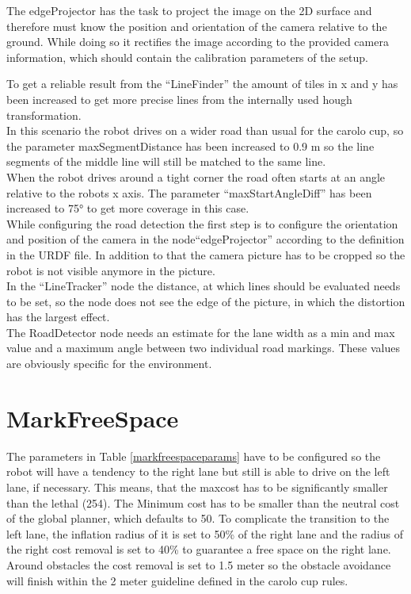 The edgeProjector has the task to project the image on the 2D surface and therefore must know the position and orientation of the camera relative to the ground. While doing so it rectifies the image according to the provided camera information, which should contain the calibration parameters of the setup.

To get a reliable result from the ``LineFinder'' the amount of tiles in x and y has been increased to get more precise lines from the internally used hough transformation.\\
In this scenario the robot drives on a wider road than usual for the carolo cup, so the parameter maxSegmentDistance has been increased to 0.9 m so the line segments of the middle line will still be matched to the same line.\\
When the robot drives around a tight corner the road often starts at an angle relative to the robots x axis. The parameter ``maxStartAngleDiff'' has been increased to 75° to get more coverage in this case.\\

While configuring the road detection the first step is to configure the orientation and position of the camera in the node``edgeProjector'' according to the definition in the URDF file. In addition to that the camera picture has to be cropped so the robot is not visible anymore in the picture.\\

In the ``LineTracker'' node the distance, at which lines should be evaluated needs to be set, so the node does not see the edge of the picture, in which the distortion has the largest effect.\\


The RoadDetector node needs an estimate for the lane width as a min and max value and a maximum angle between two individual road markings. These values are obviously specific for the environment.\\

\section{MarkFreeSpace}

The parameters in Table \ref{markfreespaceparams} have to be configured so the robot will have a tendency to the right lane but still is able to drive on the left lane, if necessary. This means, that the maxcost has to be significantly smaller than the lethal (254). The Minimum cost has to be smaller than the neutral cost of the global planner, which defaults to 50. To complicate the transition to the left lane, the inflation radius of it is set to 50\% of the right lane and the radius of the right cost removal  is set to 40\% to guarantee a free space on the right lane.\\
Around obstacles the cost removal is set to 1.5 meter so the obstacle avoidance will finish within the 2 meter guideline defined in the carolo cup rules\cite{carolocup}.\\

